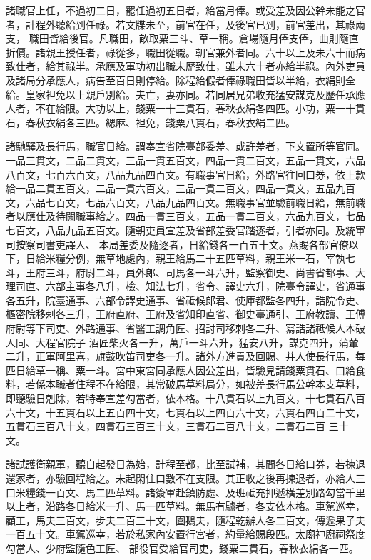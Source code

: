 \begin{pinyinscope}
 諸職官上任，不過初二日，罷任過初五日者，給當月俸。或受差及因公幹未能之官者，計程外聽給到任祿。若文牒未至，前官在任，及後官已到，前官差出，其祿兩支，
 職田皆給後官。凡職田，畝取粟三斗、草一稱。倉場隨月俸支俸，曲則隨直折價。諸親王授任者，祿從多，職田從職。朝官兼外者同。六十以上及未六十而病致仕者，給其祿半。承應及軍功初出職未歷致仕，雖未六十者亦給半祿。內外吏員及諸局分承應人，病告至百日則停給。除程給假者俸祿職田皆以半給，衣絹則全給。皇家袒免以上親戶別給。夫亡，妻亦同。若同居兄弟收充猛安謀克及歷任承應人者，不在給限。大功以上，錢粟一十三貫石，春秋衣絹各四匹。小功，粟一十貫石，春秋衣絹各三匹。緦麻、袒免，錢粟八貫石，春秋衣絹二匹。



 諸馳驛及長行馬，職官日給。謂奉宣省院臺部委差、或許差者，下文置所等官同。一品三貫文，二品二貫文，三品一貫五百文，四品一貫二百文，五品一貫文，六品八百文，七百六百文，八品九品四百文。有職事官日給，外路官往回口券，依上款給一品二貫五百文，二品一貫六百文，三品一貫二百文，四品一貫文，五品九百文，六品七百文，七品六百文，八品九品四百文。無職事官並驗前職日給，無前職者以應仕及待闕職事給之。四品一貫三百文，五品一貫二百文，六品九百文，七品七百文，八品九品五百文。隨朝吏員宣差及省部差委官踏逐者，引者亦同。及統軍司按察司書吏譯人、
 本局差委及隨逐者，日給錢各一百五十文。燕賜各部官僚以下，日給米糧分例，無草地處內，親王給馬二十五匹草料，親王米一石，宰執七斗，王府三斗，府尉二斗，員外郎、司馬各一斗六升，監察御史、尚書省都事、大理司直、六部主事各八升，檢、知法七升，省令、譯史六升，院臺令譯史，省通事各五升，院臺通事、六部令譯史通事、省祗候郎君、使庫都監各四升，誥院令史、樞密院移剌各三升，王府直府、王府及省知印直省、御史臺通引、王府教讀、王傅府尉等下司吏、外路通事、省醫工調角匠、招討司移剌各二升、寫誥諸祗候人本破人同、大程官院子
 酒匠柴火各一升，萬戶一斗六升，猛安八升，謀克四升，蒲輦二升，正軍阿里喜，旗鼓吹笛司吏各一升。諸外方進貢及回賜、并人使長行馬，每匹日給草一稱、粟一斗。宮中東宮同承應人因公差出，皆驗見請錢粟貫石、口給食料，若係本職者住程不在給限，其常破馬草料局分，如被差長行馬公幹本支草料，即聽驗日剋除，若特奉宣差勾當者，依本格。十八貫石以上九百文，十七貫石八百六十文，十五貫石以上五百四十文，七貫石以上四百六十文，六貫石四百二十文，五貫石三百八十文，四貫石三百三十文，三貫石二百八十文，二貫石二百
 三十文。



 諸試護衛親軍，聽自起發日為始，計程至都，比至試補，其間各日給口券，若揀退還家者，亦驗回程給之。未起閑住口數不在支限。其正收之後再揀退者，亦給人三口米糧錢一百文、馬二匹草料。諸簽軍赴鎮防處、及班祗充押遞橫差別路勾當千里以上者，沿路各日給米一升、馬一匹草料。無馬有驢者，各支依本格。車駕巡幸，顧工，馬夫三百文，步夫二百三十文，圍鵝夫，隨程乾辦人各二百文，傳遞果子夫一百五十文。車駕巡幸，若於私家內安置行宮者，約量給賜段匹。太廟神廚祠祭度勾當人、少府監隨色工匠、
 部役官受給官司吏，錢粟二貫石，春秋衣絹各一匹。




\end{pinyinscope}
